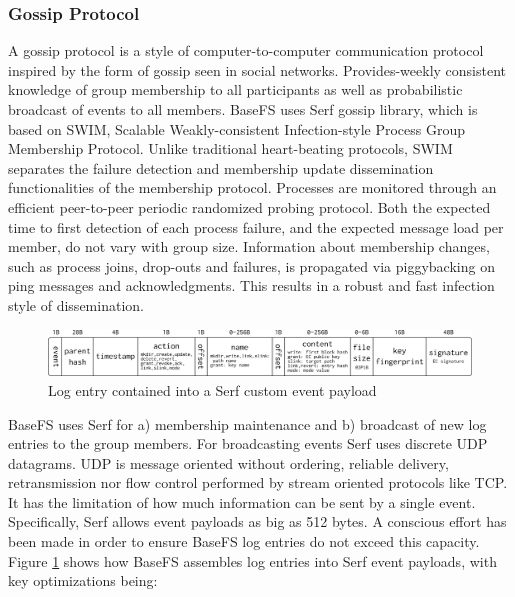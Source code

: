 \documentclass{sig-alternate}
\begin{document}
\subsubsection{Gossip Protocol}\label{gossip-protocol}

A gossip protocol is a style of computer-to-computer communication protocol inspired by the form of gossip seen in social networks. Provides-weekly consistent knowledge of group membership to all participants as well as probabilistic broadcast of events to all members. BaseFS uses Serf gossip library, which is based on SWIM, Scalable Weakly-consistent Infection-style Process Group Membership Protocol\cite{SWIM}. Unlike traditional heart-beating protocols, SWIM separates the failure detection and membership update dissemination functionalities of the membership protocol. Processes are monitored through an efficient peer-to-peer periodic randomized probing protocol. Both the expected time to first detection of each process failure, and the expected message load per member, do not vary with group size. Information about membership changes, such as process joins, drop-outs and failures, is propagated via piggybacking on ping messages and acknowledgments. This results in a robust and fast infection style of dissemination. 


\begin{figure}
\centering
\includegraphics[width=\textwidth]{imgs/payload.png}
\caption{Log entry contained into a Serf custom event payload}
\label{fig:payload}
\end{figure}

BaseFS uses Serf for a) membership maintenance and b) broadcast of new log entries to the group members. For broadcasting events Serf uses discrete UDP datagrams. UDP is message oriented without ordering, reliable delivery, retransmission nor flow control performed by stream oriented protocols like TCP. It has the limitation of how much information can be sent by a single event. Specifically, Serf allows event payloads as big as 512 bytes. A conscious effort has been made in order to ensure BaseFS log entries do not exceed this capacity. Figure \ref{fig:payload} shows how BaseFS assembles log entries into Serf event payloads, with key optimizations being:
\end{document}
